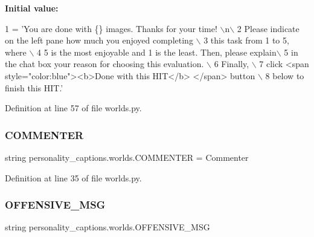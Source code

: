 {\bfseries Initial value\+:}
\begin{DoxyCode}
1 =  \textcolor{stringliteral}{'You are done with \{\} images. Thanks for your time! \(\backslash\)n\(\backslash\)}
2 \textcolor{stringliteral}{        Please indicate on the left pane how much you enjoyed completing \(\backslash\)}
3 \textcolor{stringliteral}{        this task from 1 to 5, where \(\backslash\)}
4 \textcolor{stringliteral}{        5 is the most enjoyable and 1 is the least. Then, please explain\(\backslash\)}
5 \textcolor{stringliteral}{        in the chat box your reason for choosing this evaluation. \(\backslash\)}
6 \textcolor{stringliteral}{        Finally, \(\backslash\)}
7 \textcolor{stringliteral}{        click <span style="color:blue"><b>Done with this HIT</b> </span> button \(\backslash\)}
8 \textcolor{stringliteral}{        below to finish this HIT.'}
\end{DoxyCode}


Definition at line 57 of file worlds.\+py.

\mbox{\label{namespacepersonality__captions_1_1worlds_a116a8ecbe9a208d52db1f2721e8bc5c3}} 
\subsubsection{\texorpdfstring{C\+O\+M\+M\+E\+N\+T\+ER}{COMMENTER}}
{\footnotesize\ttfamily string personality\+\_\+captions.\+worlds.\+C\+O\+M\+M\+E\+N\+T\+ER = \textquotesingle{}Commenter\textquotesingle{}}



Definition at line 35 of file worlds.\+py.

\mbox{\label{namespacepersonality__captions_1_1worlds_a212493dbb463ab37f495b8d85421d240}} 
\subsubsection{\texorpdfstring{O\+F\+F\+E\+N\+S\+I\+V\+E\+\_\+\+M\+SG}{OFFENSIVE\_MSG}}
{\footnotesize\ttfamily string personality\+\_\+captions.\+worlds.\+O\+F\+F\+E\+N\+S\+I\+V\+E\+\_\+\+M\+SG}

